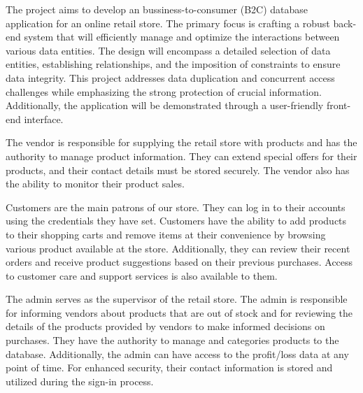\documentclass{article}
\begin{document}
\begin{flushleft}
    \par The project aims to develop an bussiness-to-consumer (B2C) database application for an online retail store. The primary focus is crafting a robust back-end system that will efficiently manage and optimize the 
    interactions between various data entities. The design will encompass a detailed selection of data entities, establishing relationships, and the imposition of constraints to ensure data integrity.
    This project addresses data duplication and concurrent access challenges while emphasizing the strong protection of crucial information. Additionally, the application will be demonstrated through a user-friendly front-end interface. \\
    \hspace*{1cm} 
    \par The vendor is responsible for supplying the retail store with products and has the authority to manage product information. 
    They can extend special offers for their products, and their contact details must be stored securely. 
    The vendor also has the ability to monitor their product sales.
    \hspace*{1cm} 
    \par Customers are the main patrons of our store. 
    They can log in to their accounts using the credentials they have set. 
    Customers have the ability to add products to their shopping carts and remove items at their convenience by browsing various product available at the store. 
    Additionally, they can review their recent orders and receive product suggestions based on their previous purchases. 
    Access to customer care and support services is also available to them. \\
    \hspace*{1cm} 
    \par The admin serves as the supervisor of the retail store. 
    The admin is responsible for informing vendors about products that are out of stock and for reviewing the details of the products provided by vendors to make informed decisions on purchases. 
    They have the authority to manage and categories products to the database. 
    Additionally, the admin can have access to the profit/loss data at any point of time. 
    For enhanced security, their contact information is stored and utilized during the sign-in process.
    
\end{flushleft}
\
\end{document}
